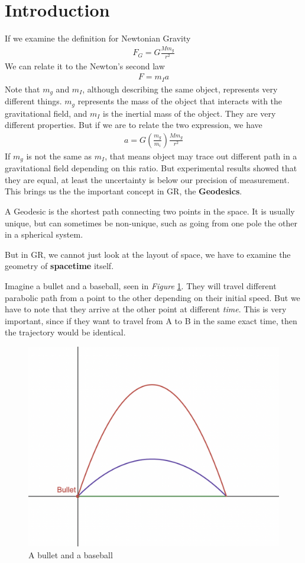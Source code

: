 \documentclass[12pt]{book}
\newcommand{\paren}[1]{\left( #1 \right)}
\begin{document}
\section{Introduction}
If we examine the definition for Newtonian Gravity
\begin{align}
F_G = G\frac{Mm_g}{r^2}
\end{align}
We can relate it to the Newton's second law
\begin{align}
F = m_I a
\end{align}
Note that $m_g$ and $m_I$, although describing the same object, represents very different things. $m_g$ represents the mass of the object that interacts with the gravitational field, and $m_I$ is the inertial mass of the object. They are very different properties. But if we are to relate the two expression, we have
\begin{align}
a = G\paren{\frac{m_g}{m_i}}\frac{Mm_g}{r^2}
\end{align}
If $m_g$ is not the same as $m_I$, that means object may trace out different path in a gravitational field depending on this ratio. But experimental results showed that they are equal, at least the uncertainty is below our precision of measurement. This brings us the the important concept in GR, the \textbf{Geodesics}.

A Geodesic is the shortest path connecting two points in the space. It is usually unique, but can sometimes be non-unique, such as going from one pole the other in a spherical system. 

But in GR, we cannot just look at the layout of space, we have to examine the geometry of \textbf{spacetime} itself. 

Imagine a bullet and a baseball, seen in \textit{Figure} \ref{fig:5.1.1}. They will travel different parabolic path from a point to the other depending on their initial speed. But we have to note that they arrive at the other point at different \textit{time}. This is very important, since if they want to travel from A to B in the same exact time, then the trajectory would be identical. 

\begin{figure}[!h]
    \centering
    \includegraphics[width=0.5\linewidth]{picture/GRW1-1.png}
    \caption{A bullet and a baseball}
    \label{fig:5.1.1}
\end{figure}
\end{document}
